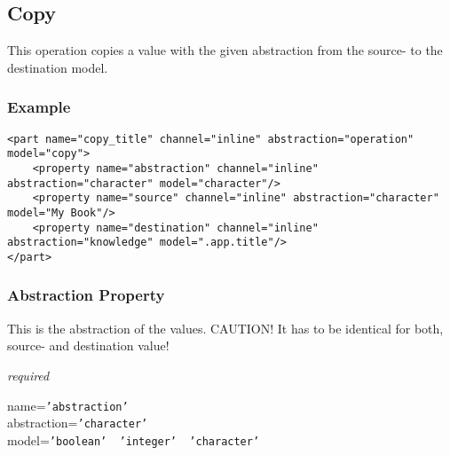 %
%
%
%
%
%

\subsection{Copy}
\label{copy_heading}

This operation copies a value with the given abstraction from the source- to
the destination model.

\subsubsection{Example}

\begin{scriptsize}
    \begin{verbatim}
<part name="copy_title" channel="inline" abstraction="operation" model="copy">
    <property name="abstraction" channel="inline" abstraction="character" model="character"/>
    <property name="source" channel="inline" abstraction="character" model="My Book"/>
    <property name="destination" channel="inline" abstraction="knowledge" model=".app.title"/>
</part>
    \end{verbatim}
\end{scriptsize}

\subsubsection{Abstraction Property}

This is the abstraction of the values. CAUTION! It has to be identical for
both, source- and destination value!

\emph{required}

name=\texttt{'abstraction'}\\
abstraction=\texttt{'character'}\\
model=\texttt{'boolean' \vline\ 'integer' \vline\ 'character'}

